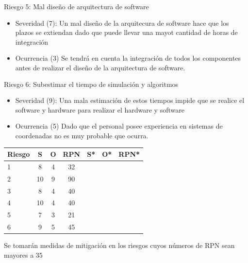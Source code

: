 \documentclass[
11pt, %
]{charter}
\begin{document}
Riesgo 5:  Mal diseño de arquitectura de software
\begin{itemize}
	\item Severidad (7):
	\newline Un mal diseño de la arquitecura de software hace que los plazos se extiendan dado que puede llevar una mayot cantidad de horas de integración  
	\item Ocurrencia (3)\newline 
	Se tendrá en cuenta la integración de todos los componentes antes de realizar el diseño de la arquitectura de software.  
\end{itemize}



Riesgo 6:  Subestimar el tiempo de simulación y algoritmos
\begin{itemize}
	\item Severidad (9):
	\newline Una mala estimación de estos tiempos impide que se realice el software y hardware para realizar el hardware y software 
	\item Ocurrencia (5)\newline 
	Dado que el personal posee experiencia en sistemas de coordenadas no es muy probable que ocurra. 
\end{itemize}






\begin{table}[htpb]
\centering



\begin{tabularx}{\linewidth}{@{}|X|c|c|c|c|c|c|@{}}
\hline
\rowcolor[HTML]{C0C0C0} 
Riesgo  & S  & O & RPN & S* & O* & RPN* \\ \hline
     1  & 8  & 4 & 32  &    &    &      \\ \hline
     2  & 10 & 9 & 90  &    &    &      \\ \hline
     3  & 8  & 4 & 40  &    &    &      \\ \hline
     4  & 10 & 4 & 40  &    &    &      \\ \hline
     5  & 7  & 3 & 21  &    &    &      \\ \hline
     6  & 9  & 5 & 45  &    &    &      \\ \hline

\end{tabularx}
\end{table}

Se tomarán medidas de mitigación en los riesgos cuyos números de RPN sean mayores a 35
\end{document}
